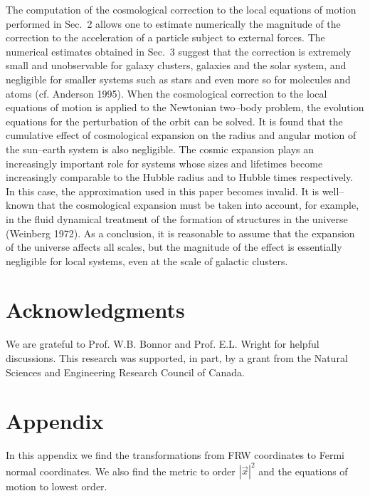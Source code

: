   
  The
  computation of the cosmological correction to the local equations of
motion
  performed in Sec.~2 allows one to estimate numerically the magnitude of
the
  correction to the acceleration of a particle subject to external forces.
The
  numerical estimates obtained in Sec.~3 suggest that the correction is
extremely
  small and
  unobservable for galaxy clusters, galaxies and the solar system, and
  negligible for smaller systems such as stars and even more so for
molecules and
  atoms (cf. Anderson 1995). When the cosmological correction
  to the local equations of
  motion is applied to the Newtonian two--body problem, the evolution
equations
  for the perturbation of the orbit can be solved. It is found that the
  cumulative effect of cosmological expansion on the radius and angular
motion of
  the sun--earth system is also negligible. The cosmic expansion plays an
  increasingly important role for systems whose sizes and
  lifetimes become increasingly comparable to the Hubble radius and to
Hubble
  times respectively. In this case, the
  approximation used in this paper becomes invalid. It is
  well--known that the cosmological expansion must be taken into account,
for
  example, in the fluid dynamical treatment of the formation of structures
in
  the universe (Weinberg 1972). As a conclusion, it is reasonable to
assume that
  the expansion of the universe
  affects all scales, but the magnitude of the effect is 
  essentially negligible for local systems, even at the scale of galactic 
  clusters.
  
  
  \section*{Acknowledgments}
  
  We are grateful to Prof. W.B. Bonnor and Prof. E.L. Wright 
  for helpful discussions. 
  This research was supported, in part, by a grant from the Natural Sciences 
  and Engineering Research Council of Canada. 
  \clearpage
  
\section*{Appendix}

In this appendix we find the transformations from FRW coordinates to
Fermi normal coordinates. We also find the metric to order $|\vec{x}|^2$
and the equations of motion to lowest order.
  
